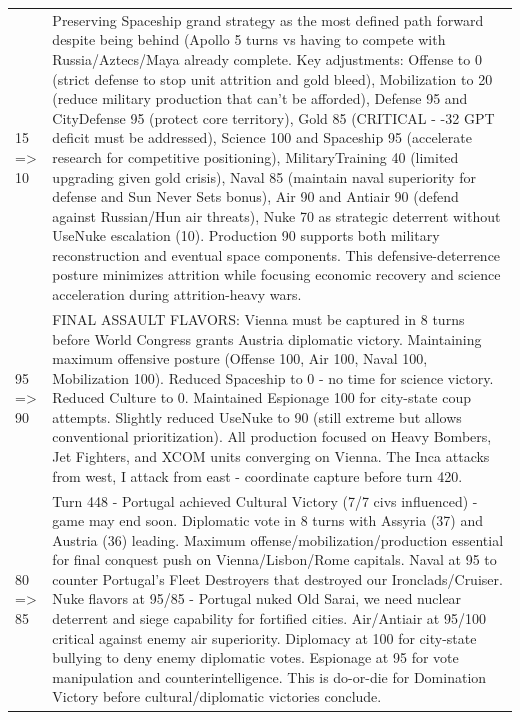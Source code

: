 \begin{longtable}{p{}p{}}
15 => 10 & Preserving Spaceship grand strategy as the most defined path forward despite being behind (Apollo 5 turns vs having to compete with Russia/Aztecs/Maya already complete. Key adjustments: Offense to 0 (strict defense to stop unit attrition and gold bleed), Mobilization to 20 (reduce military production that can't be afforded), Defense 95 and CityDefense 95 (protect core territory), Gold 85 (CRITICAL - -32 GPT deficit must be addressed), Science 100 and Spaceship 95 (accelerate research for competitive positioning), MilitaryTraining 40 (limited upgrading given gold crisis), Naval 85 (maintain naval superiority for defense and Sun Never Sets bonus), Air 90 and Antiair 90 (defend against Russian/Hun air threats), Nuke 70 as strategic deterrent without UseNuke escalation (10). Production 90 supports both military reconstruction and eventual space components. This defensive-deterrence posture minimizes attrition while focusing economic recovery and science acceleration during attrition-heavy wars. \\
95 => 90 & FINAL ASSAULT FLAVORS: Vienna must be captured in 8 turns before World Congress grants Austria diplomatic victory. Maintaining maximum offensive posture (Offense 100, Air 100, Naval 100, Mobilization 100). Reduced Spaceship to 0 - no time for science victory. Reduced Culture to 0. Maintained Espionage 100 for city-state coup attempts. Slightly reduced UseNuke to 90 (still extreme but allows conventional prioritization). All production focused on Heavy Bombers, Jet Fighters, and XCOM units converging on Vienna. The Inca attacks from west, I attack from east - coordinate capture before turn 420. \\
80 => 85 & Turn 448 - Portugal achieved Cultural Victory (7/7 civs influenced) - game may end soon. Diplomatic vote in 8 turns with Assyria (37) and Austria (36) leading. Maximum offense/mobilization/production essential for final conquest push on Vienna/Lisbon/Rome capitals. Naval at 95 to counter Portugal's Fleet Destroyers that destroyed our Ironclads/Cruiser. Nuke flavors at 95/85 - Portugal nuked Old Sarai, we need nuclear deterrent and siege capability for fortified cities. Air/Antiair at 95/100 critical against enemy air superiority. Diplomacy at 100 for city-state bullying to deny enemy diplomatic votes. Espionage at 95 for vote manipulation and counterintelligence. This is do-or-die for Domination Victory before cultural/diplomatic victories conclude. \\

\end{longtable}
